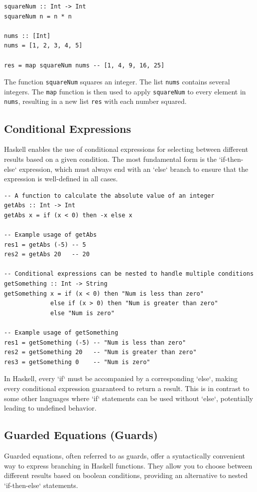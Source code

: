 \documentclass[a4paper, 10pt]{article}
\begin{document}
            \begin{lstlisting}
squareNum :: Int -> Int
squareNum n = n * n

nums :: [Int]
nums = [1, 2, 3, 4, 5]

res = map squareNum nums -- [1, 4, 9, 16, 25]
            \end{lstlisting}

            The function \texttt{squareNum} squares an integer. The list \texttt{nums} contains several integers. The \texttt{map} function is then used to apply \texttt{squareNum} to every element in \texttt{nums}, resulting in a new list \texttt{res} with each number squared.


        \subsection{Conditional Expressions}
            Haskell enables the use of conditional expressions for selecting between different results based on a given condition. The most fundamental form is the `if-then-else` expression, which must always end with an `else` branch to ensure that the expression is well-defined in all cases.

            \lstset{language=Haskell}
            \begin{lstlisting}
-- A function to calculate the absolute value of an integer
getAbs :: Int -> Int
getAbs x = if (x < 0) then -x else x

-- Example usage of getAbs
res1 = getAbs (-5) -- 5
res2 = getAbs 20   -- 20

-- Conditional expressions can be nested to handle multiple conditions
getSomething :: Int -> String
getSomething x = if (x < 0) then "Num is less than zero"
             else if (x > 0) then "Num is greater than zero"
             else "Num is zero"

-- Example usage of getSomething
res1 = getSomething (-5) -- "Num is less than zero"
res2 = getSomething 20   -- "Num is greater than zero"
res3 = getSomething 0    -- "Num is zero"
            \end{lstlisting}

            In Haskell, every `if` must be accompanied by a corresponding `else`, making every conditional expression guaranteed to return a result. This is in contrast to some other languages where `if` statements can be used without `else`, potentially leading to undefined behavior.


        \subsection{Guarded Equations (Guards)}
            Guarded equations, often referred to as guards, offer a syntactically convenient way to express branching in Haskell functions. They allow you to choose between different results based on boolean conditions, providing an alternative to nested `if-then-else` statements.
\end{document}
